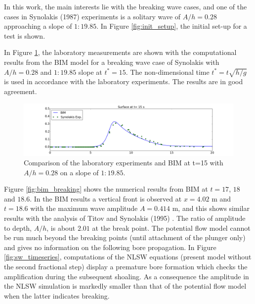 \documentclass[review]{elsarticle}
\begin{document}
In this work, the main interests lie 
with the breaking wave cases, and 
one of the cases in Synolakis (1987) experiments is  
a solitary wave of $A/h=0.28$ approaching a slope of $1:19.85$.
In Figure \ref{fig:init_setup}, 
the initial set-up for a test is shown. 


In Figure \ref{fig:lab_bim}, the laboratory measurements
are shown with the computational results from the BIM model
for a breaking wave case of Synolakis with $A/h=0.28$ and $1:19.85$ slope
at $t^*=15$. The non-dimensional time 
$t^*=t\sqrt{h/g}$ is used 
in accordance with the laboratory experiments.
The results are in good agreement. 

\begin{figure}[!htb]
\centering
\includegraphics[width=\textwidth]{_fig/lab_bim_t15.png}
\caption{Comparison of the laboratory experiments and BIM at t=15 with $A/h=0.28$ 
on a slope of $1:19.85$.}
\label{fig:lab_bim}
\end{figure}

Figure \ref{fig:bim_breaking} shows
the numerical results from BIM at $t=17$, $18$ and  $18.6$.
In the BIM results a
 vertical front is observed at $x=4.02$ m and $t=18.6$
with the maximum wave amplitude $A=0.414$ m,
and this shows similar results with 
the analysis of Titov and Synolakis (1995) \cite{titov1995modeling}.
The ratio of amplitude to depth, $A/h$, 
is about $2.01$ at the break point.
The potential flow model cannot be run much beyond the
breaking points (until attachment of the plunger only) and 
gives no information on the following  bore propagation.
In Figure \ref{fig:sw_timeseries}, 
computations of the NLSW equations (present model without the second 
fractional step) display a premature bore formation which checks the
amplification during the subsequent shoaling. 
As a consequence the amplitude in the NLSW simulation is markedly smaller than that of the 
potential flow model when the latter indicates breaking.
\end{document}
